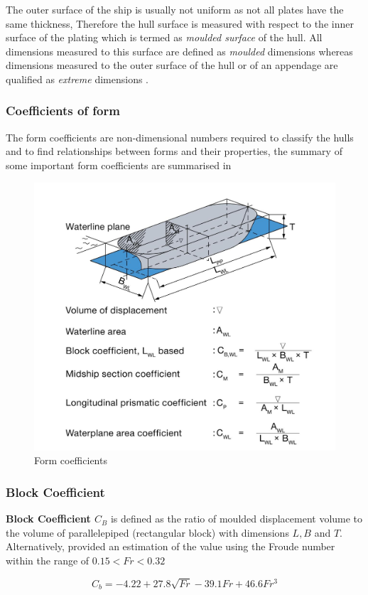 The outer surface of the ship is usually not uniform as not all plates have the same thickness, Therefore the hull surface is measured with respect to the inner surface of the plating which is termed as \emph{moulded surface} of the hull. All dimensions measured to this surface are defined as \emph{moulded} dimensions whereas dimensions measured to the outer surface of the hull or of an appendage are qualified as \emph{extreme} dimensions .

\subsubsection*{Coefficients of form}

The form coefficients are non-dimensional numbers required to classify the hulls and to find relationships between forms and their properties, the summary of some important form coefficients are summarised in  

\begin{figure}[ht]
    \centering
        \includegraphics[width=.6\textwidth]{02_figures/man11_shipcoeff.jpg}
        \caption{Form coefficients }
        \label{fig:man_formcoeff}
\end{figure}

\subsubsection*{Block Coefficient}
\textbf{Block Coefficient $C_B$} is defined as the ratio of moulded displacement volume to the volume of parallelepiped (rectangular block) with dimensions $L,B$ and $T$. Alternatively,  provided an estimation of the value using the Froude number within the range of $0.15 < Fr < 0.32$

\begin{equation}
    \label{eqn:Cb_Schneekluth}
    C_b = -4.22 + 27.8\sqrt{Fr} - 39.1Fr + 46.6Fr^3
\end{equation}

